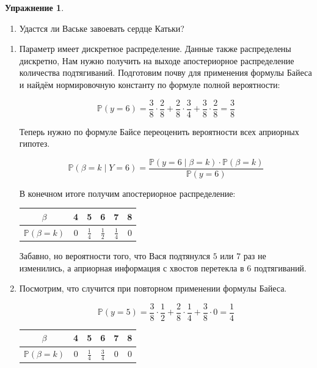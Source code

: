 \documentclass[12pt, a4paper, oneside]{extreport}
\def \mbb{\mathbb}
\def \PP{\mbb{P}}
\theoremstyle{plain}              %
\theoremstyle{definition}         %
\newtheorem{problem}{\color{myblue} Упражнение}
\begin{document}
\begin{problem}
\begin{enumerate}
	\item Удастся ли Ваське завоевать сердце Катьки? 
\end{enumerate} 

	\begin{sol}
\begin{enumerate}
	
	\item Параметр имеет дискретное распределение. Данные также распределены дискретно, Нам нужно получить на выходе апостериорное распределение количества подтягиваний. Подготовим почву для применения формулы Байеса и найдём нормировочную константу по формуле полной вероятности: 
	
	\[ \PP(y = 6) = \frac{3}{8} \cdot \frac{2}{8} +\frac{2}{8} \cdot \frac{3}{4} + \frac{3}{8} \cdot \frac{2}{8} = \frac{3}{8} \]
	
	Теперь нужно по формуле Байсе переоценить вероятности всех априорных гипотез. 
	
	\[ \PP(\beta = k \mid Y = 6) = \frac{\PP(y = 6 \mid \beta = k) \cdot \PP(\beta = k) }{ \PP(y=6)}\]
	
	В конечном итоге получим апостериорное распределение: 
	
	\begin{center}
		\begin{tabular}{c|c|c|c|c|c}
			$\beta$ & 4 & 5 & 6 & 7 & 8 \\ \hline
			$\PP(\beta = k)$ & $0 $ & $\frac{1}{4}$ &  $\frac{1}{2}$ &  $\frac{1}{4}$ &  $0$ \\ 
		\end{tabular}
	\end{center}
	
	Забавно, но вероятности того, что Вася подтянулся $5$ или $7$ раз не изменились, а априорная информация с хвостов перетекла в $6$ подтягиваний. 
	
	\item Посмотрим, что случится при повторном применении формулы Байеса. 
	
	\[ \PP(y = 5) = \frac{3}{8} \cdot \frac{1}{2} +\frac{2}{8} \cdot \frac{1}{4} + \frac{3}{8} \cdot  0 = \frac{1}{4} \]
	
	\begin{center}
		\begin{tabular}{c|c|c|c|c|c}
			$\beta$ & 4 & 5 & 6 & 7 & 8 \\ \hline
			$\PP(\beta = k)$ & $0 $ & $ \frac{1}{4}$ &  $ \frac{3}{4}$ &  $ 0$ &  $0$ \\ 
		\end{tabular}
	\end{center}
	

\end{enumerate}
\end{sol}
\end{problem}
\end{document}
